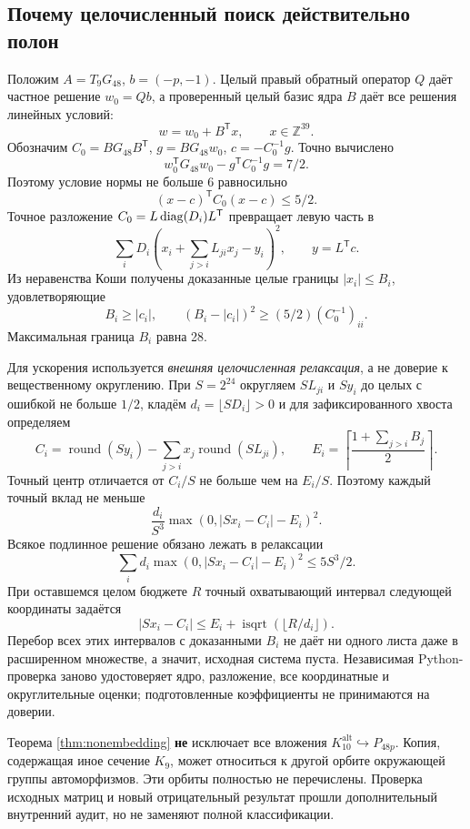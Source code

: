 \documentclass[11pt,a4paper]{article}
\theoremstyle{remark}\newtheorem{remark}[theorem]{Замечание}
\newcommand{\Z}{\mathbb Z}\newcommand{\R}{\mathbb R}\newcommand{\F}{\mathbb F}
\newcommand{\Kalt}{K_{10}^{\mathrm{alt}}}
\begin{document}
\subsection{Почему целочисленный поиск действительно полон}

Положим $A=T_9G_{48}$, $b=(-p,-1)$. Целый правый обратный оператор $Q$ даёт частное решение $w_0=Qb$, а проверенный целый базис ядра $B$ даёт все решения линейных условий:
\[
w=w_0+B^{\mathsf T}x,\qquad x\in\Z^{39}.
\]
Обозначим $C_0=BG_{48}B^{\mathsf T}$, $g=BG_{48}w_0$, $c=-C_0^{-1}g$. Точно вычислено
\[
w_0^{\mathsf T}G_{48}w_0-g^{\mathsf T}C_0^{-1}g=7/2.
\]
Поэтому условие нормы не больше 6 равносильно
\[
(x-c)^{\mathsf T}C_0(x-c)\le5/2.
\]
Точное разложение $C_0=L\operatorname{diag}(D_i)L^{\mathsf T}$ превращает левую часть в
\[
\sum_iD_i\left(x_i+\sum_{j>i}L_{ji}x_j-y_i\right)^2,\qquad y=L^{\mathsf T}c.
\]
Из неравенства Коши получены доказанные целые границы $|x_i|\le B_i$, удовлетворяющие
\[
B_i\ge|c_i|,\qquad (B_i-|c_i|)^2\ge(5/2)(C_0^{-1})_{ii}.
\]
Максимальная граница $B_i$ равна 28.

Для ускорения используется \emph{внешняя целочисленная релаксация}, а не доверие к вещественному округлению. При $S=2^{24}$ округляем $SL_{ji}$ и $Sy_i$ до целых с ошибкой не больше $1/2$, кладём $d_i=\lfloor SD_i\rfloor>0$ и для зафиксированного хвоста определяем
\[
C_i=\operatorname{round}(Sy_i)-\sum_{j>i}x_j\operatorname{round}(SL_{ji}),\qquad
E_i=\left\lceil\frac{1+\sum_{j>i}B_j}{2}\right\rceil.
\]
Точный центр отличается от $C_i/S$ не больше чем на $E_i/S$. Поэтому каждый точный вклад не меньше
\[
\frac{d_i}{S^3}\max(0,|Sx_i-C_i|-E_i)^2.
\]
Всякое подлинное решение обязано лежать в релаксации
\[
\sum_i d_i\max(0,|Sx_i-C_i|-E_i)^2\le5S^3/2.
\]
При оставшемся целом бюджете $R$ точный охватывающий интервал следующей координаты задаётся
\[
|Sx_i-C_i|\le E_i+\operatorname{isqrt}(\lfloor R/d_i\rfloor).
\]
Перебор всех этих интервалов с доказанными $B_i$ не даёт ни одного листа даже в расширенном множестве, а значит, исходная система пуста. Независимая Python-проверка заново удостоверяет ядро, разложение, все координатные и округлительные оценки; подготовленные коэффициенты не принимаются на доверии.

Теорема \ref{thm:nonembedding} \textbf{не} исключает все вложения $\Kalt\hookrightarrow P_{48p}$. Копия, содержащая иное сечение $K_9$, может относиться к другой орбите окружающей группы автоморфизмов. Эти орбиты полностью не перечислены. Проверка исходных матриц и новый отрицательный результат прошли дополнительный внутренний аудит, но не заменяют полной классификации.
\end{document}
